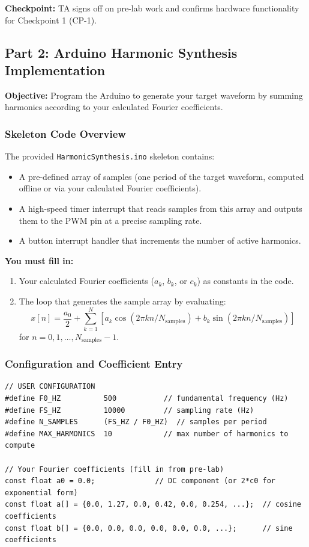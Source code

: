 \documentclass[11pt,letterpaper]{article}
\providecommand{\cpECE}[1]{\textcolor{OliveGreen}{\textbf{Checkpoint:} #1}}
\begin{document}
\cpECE{TA signs off on pre-lab work and confirms hardware functionality for Checkpoint 1 (CP-1).}

\subsection{Part 2: Arduino Harmonic Synthesis Implementation}

\textbf{Objective:} Program the Arduino to generate your target waveform by summing harmonics according to your calculated Fourier coefficients.

\subsubsection*{Skeleton Code Overview}

The provided \texttt{HarmonicSynthesis.ino} skeleton contains:

\begin{itemize}
    \item A pre-defined array of samples (one period of the target waveform, computed offline or via your calculated Fourier coefficients).
    \item A high-speed timer interrupt that reads samples from this array and outputs them to the PWM pin at a precise sampling rate.
    \item A button interrupt handler that increments the number of active harmonics.
\end{itemize}

\noindent
\textbf{You must fill in:}
\begin{enumerate}
    \item Your calculated Fourier coefficients ($a_k$, $b_k$, or $c_k$) as constants in the code.
    \item The loop that generates the sample array by evaluating:
    \begin{equation}
    x[n] = \frac{a_0}{2} + \sum_{k=1}^{N} \left[ a_k \cos(2\pi k n / N_{\text{samples}}) + b_k \sin(2\pi k n / N_{\text{samples}}) \right]
    \end{equation}
    for $n = 0, 1, \ldots, N_{\text{samples}} - 1$.
\end{enumerate}

\subsubsection*{Configuration and Coefficient Entry}

\begin{verbatim}
// USER CONFIGURATION
#define F0_HZ          500           // fundamental frequency (Hz)
#define FS_HZ          10000         // sampling rate (Hz)
#define N_SAMPLES      (FS_HZ / F0_HZ)  // samples per period
#define MAX_HARMONICS  10            // max number of harmonics to compute

// Your Fourier coefficients (fill in from pre-lab)
const float a0 = 0.0;              // DC component (or 2*c0 for exponential form)
const float a[] = {0.0, 1.27, 0.0, 0.42, 0.0, 0.254, ...};  // cosine coefficients
const float b[] = {0.0, 0.0, 0.0, 0.0, 0.0, 0.0, ...};      // sine coefficients
\end{verbatim}
\end{document}
